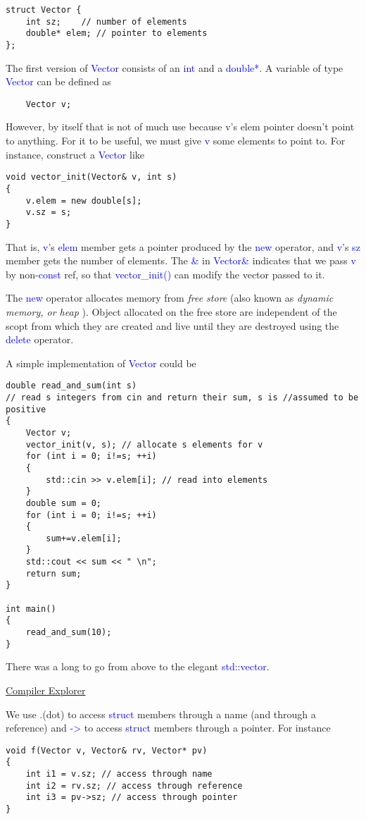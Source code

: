\documentclass{article}
\newcommand{\be}[1]{\textcolor{blue}{#1}}
\begin{document}
\begin{verbatim}
struct Vector {
    int sz;    // number of elements
    double* elem; // pointer to elements
};	
\end{verbatim}
The first version of \be{Vector} consists of an \be{int} and a \be{double*}. A variable of type \be{Vector} can be defined as 
\begin{verbatim}
	Vector v;
\end{verbatim}
However, by itself that is not of much use because v's elem pointer doesn't point to anything. For it to be useful, we must give \be{v} some elements to point to. For instance, construct a \be{Vector} like
\begin{verbatim}
void vector_init(Vector& v, int s)
{
    v.elem = new double[s];
    v.sz = s;
}	
\end{verbatim}
That is, \be{v}'s \be{elem} member gets a pointer produced by the \be{new} operator, and \be{v}'s \be{sz} member gets the number of elements. The \be{\&} in \be{Vector\&} indicates that we pass \be{v} by non-\be{const} ref, so that \be{vector\_init()} can modify the vector passed to it.

The \be{new} operator allocates memory from \emph{free store} (also known as \emph{dynamic memory, or heap} ).
Object allocated on the free store are independent of the scopt from which they are created and live until they are destroyed using the \be{delete} operator.

A simple implementation of \be{Vector} could be 
\begin{verbatim}
double read_and_sum(int s)
// read s integers from cin and return their sum, s is //assumed to be positive
{
    Vector v;
    vector_init(v, s); // allocate s elements for v
    for (int i = 0; i!=s; ++i)
    {
        std::cin >> v.elem[i]; // read into elements
    }
    double sum = 0;
    for (int i = 0; i!=s; ++i)
    {
        sum+=v.elem[i];
    }
    std::cout << sum << " \n";
    return sum;
}

int main()
{
    read_and_sum(10);
}	
\end{verbatim}
There was a long to go from above to the elegant \be{std::vector}.

\href{https://godbolt.org/z/vjEMeP}{Compiler Explorer}

We use \be{.}(dot) to access \be{struct} members through a name (and through a reference) and \be{->} to access 
\be{struct} members through a pointer. For instance

\begin{verbatim}
void f(Vector v, Vector& rv, Vector* pv)
{
    int i1 = v.sz; // access through name
    int i2 = rv.sz; // access through reference
    int i3 = pv->sz; // access through pointer
}
\end{verbatim}
\end{document}
